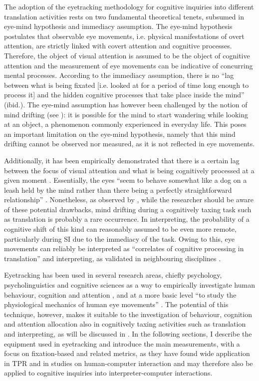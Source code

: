 The adoption of the eyetracking methodology for cognitive inquiries into different translation activities rests on two fundamental theoretical tenets, subsumed in  eye-mind hypothesis and immediacy assumption. The eye-mind hypothesis postulates that observable eye movements, i.e. physical manifestations of overt attention, are strictly linked with covert attention and cognitive processes. Therefore, the object of visual attention is assumed to be the object of cognitive attention \citep[250]{schwieter_eye_2017} and the measurement of eye movements can be indicative of concurring mental processes. According to the immediacy assumption, there is no ``lag between what is being fixated [i.e. looked at for a period of time long enough to process it] and the hidden cognitive processes that take place inside the mind'' (ibid.). The eye-mind assumption has however been challenged by the notion of mind drifting (see \citealt{posner_orienting_1980,smallwood_restless_2006}): it is possible for the mind to start wandering while looking at an object, a phenomenon commonly experienced in everyday life. This poses an important limitation on the eye-mind hypothesis, namely that this mind drifting cannot be observed nor measured, as it is not reflected in eye movements.

Additionally, it has been empirically demonstrated that there is a certain lag between the focus of visual attention and what is being cognitively processed at a given moment \citep[409]{jakobsen_translation_2020}. Essentially, the eyes ``seem to behave somewhat like a dog on a leash held by the mind rather than there being a perfectly straightforward relationship'' \citep[34]{jakobsen_TPR_2017}. Nonetheless, as observed by \citet{hvelplund_eye_2014, schwieter_eye_2017}, while the researcher should be aware of these potential drawbacks, mind drifting during a cognitively taxing task such as translation is probably a rare occurrence. In interpreting, the probability of a cognitive shift of this kind can reasonably assumed to be even more remote, particularly during SI due to the immediacy of the task. Owing to this, eye movements can reliably be interpreted as ``correlates of cognitive processing in translation'' and interpreting, as validated in neighbouring disciplines \citep[211]{hvelplund_eye_2014}.

Eyetracking has been used in several research areas, chiefly psychology, psycholinguistics and cognitive sciences as a way to empirically investigate human behaviour, cognition and attention \citep[248]{schwieter_eye_2017}, and at a more basic level ``to study the physiological mechanics of human eye movements'' \citep[398]{jakobsen_translation_2020}. The potential of this technique, however, makes it suitable to the investigation of behaviour, cognition and attention allocation also in cognitively taxing activities such as translation and interpreting, as will be discussed in . In the following sections, I describe the equipment used in eyetracking and introduce the main measurements, with a focus on fixation-based and related metrics, as they have found wide application in TPR and in studies on human-computer interaction and may therefore also be applied to cognitive inquiries into interpreter-computer interactions.
